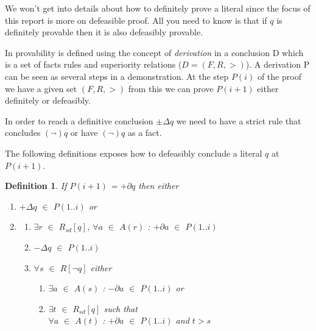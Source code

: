 \documentclass[10pt]{report}
\begin{document}
We won't get into details about how to definitely prove a literal since the focus of this report is more on defeasible proof. All you need to know is that if $q$ is definitely provable then it is also defeasibly provable.

In \autocite{RepresentationResultsDefeasibleLogic} provability is defined using the concept of \emph{derivation} in a conclusion D which is a set of facts rules and superiority relations ($D=(F,R,>)$). A derivation P can be seen as several steps in a demonstration. At the step $P(i)$ of the proof we have a given set $(F,R,>)$ from this we can prove $P(i+1)$ either definitely or defeasibly.

In order to reach a definitive conclusion $\pm\Delta q$ we need to have a strict rule that concludes $(\neg)q$ or have $(\neg)q$ as a fact. 

The following definitions exposes how to defeasibly conclude a literal $q$ at $P(i+1)$.
\newtheorem{mydef}{Definition}
\begin{mydef} \label{def-defeasible-proof}
If $P(i+1)$ = $+\partial q$ then either
\begin{enumerate}
\item $+\Delta q$ $\in$ $P(1..i)$ or
\item \begin{enumerate}
      \item $\exists r$ $\in$ $R_{sd}[q]$, $\forall a$ $\in$ $A(r)$ : $+\partial a$ $\in$ $P(1..i)$
      \item $-\Delta q$ $\in$ $P(1..i)$
      \item $\forall s$ $\in$ $R[\neg q]$ either
          \begin{enumerate}
          \item $\exists a$ $\in$ $A(s)$ : $-\partial a$ $\in$ $P(1..i)$ or
          \item $\exists t$ $\in$ $R_{sd}[q]$ such that \\ $\forall a$ $\in$ $A(t)$ : $+\partial a$ $\in$ $P(1..i)$ and $t>s$
          \end{enumerate}
      \end{enumerate}
\end{enumerate}


\end{mydef}
\end{document}
